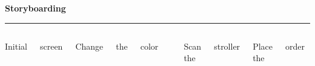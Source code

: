 \documentclass[pdf]{beamer}
\begin{document}
\begin{frame}
\vspace{8mm}
\textcolor{myBlue}{\textbf{\Large{Storyboarding}}}

\textcolor{red}{\rule{10cm}{1mm}}

\begin{columns}[t]
\vspace{-2cm}
\tiny\centerline {Initial}
\tiny\centerline {screen} \vspace{3cm} \hfill \break
\hfill \linebreak
\tiny\centerline {Change}
\tiny\centerline {the}
\tiny\centerline {color\textrightarrow}
\hspace{-1.3cm}
\centering
\includegraphics[width=4cm,height=4cm]{slide21pic1.png}\\
\hspace{-1.3cm}
\includegraphics[width=4cm,height=4cm]{slide21pic2.png} 
\vspace{-2cm}
\tiny\centerline {Scan the}
\tiny\centerline {stroller\textrightarrow} \vspace{3cm} \hfill \break
\hfill \linebreak
\tiny\centerline {Place the}
\tiny\centerline {order\textrightarrow}
\centering
\hspace{-1.3cm}
\includegraphics[width=4cm,height=4cm]{slide21pic3.png}\\

\end{columns}
\end{frame}
\end{document}
